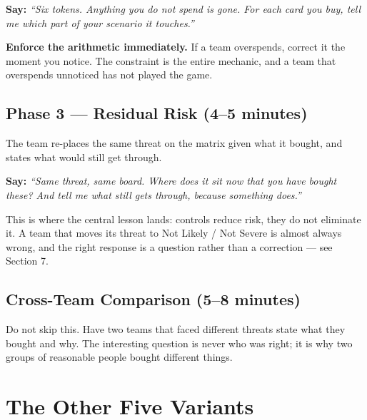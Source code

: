 \documentclass[11pt,letterpaper]{article}
\newcommand{\say}[1]{\textit{``#1''}}
\begin{document}
\textbf{Say:} \say{Six tokens. Anything you do not spend is gone. For each card
you buy, tell me which part of your scenario it touches.}

\textbf{Enforce the arithmetic immediately.} If a team overspends, correct it the
moment you notice. The constraint is the entire mechanic, and a team that
overspends unnoticed has not played the game.

\subsection{Phase 3 --- Residual Risk (4--5 minutes)}

The team re-places the same threat on the matrix given what it bought, and
states what would still get through.

\textbf{Say:} \say{Same threat, same board. Where does it sit now that you have
bought these? And tell me what still gets through, because something does.}

This is where the central lesson lands: controls reduce risk, they do not
eliminate it. A team that moves its threat to Not Likely / Not Severe is almost
always wrong, and the right response is a question rather than a correction ---
see Section 7.

\subsection{Cross-Team Comparison (5--8 minutes)}

Do not skip this. Have two teams that faced different threats state what they
bought and why. The interesting question is never who was right; it is why two
groups of reasonable people bought different things.

\section{The Other Five Variants}
\end{document}
